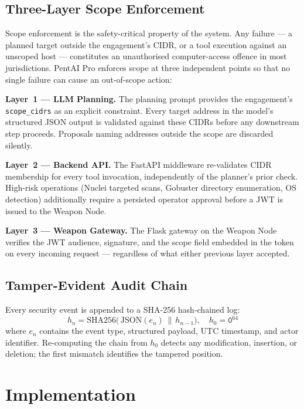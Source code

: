 \documentclass[conference]{IEEEtran}
\begin{document}
\subsection{Three-Layer Scope Enforcement}

Scope enforcement is the safety-critical property of the system.
Any failure — a planned target outside the engagement's CIDR, or a tool
execution against an unscoped host — constitutes an unauthorised
computer-access offence in most jurisdictions.
PentAI Pro enforces scope at three independent points so that no single
failure can cause an out-of-scope action:

\noindent\textbf{Layer~1 — LLM Planning.}
The planning prompt provides the engagement's \texttt{scope\_cidrs} as
an explicit constraint. Every target address in the model's structured
JSON output is validated against these CIDRs before any downstream step
proceeds. Proposals naming addresses outside the scope are discarded
silently.

\noindent\textbf{Layer~2 — Backend API.}
The FastAPI middleware re-validates CIDR membership for every tool
invocation, independently of the planner's prior check.
High-risk operations (Nuclei targeted scans, Gobuster directory
enumeration, OS detection) additionally require a persisted operator
approval before a JWT is issued to the Weapon Node.

\noindent\textbf{Layer~3 — Weapon Gateway.}
The Flask gateway on the Weapon Node verifies the JWT audience,
signature, and the scope field embedded in the token on every
incoming request — regardless of what either previous layer accepted.

\subsection{Tamper-Evident Audit Chain}

Every security event is appended to a SHA-256 hash-chained log:
\begin{equation}
h_n = \mathrm{SHA256}\!\bigl(\,\mathrm{JSON}(e_n)\,\|\,h_{n-1}\bigr),
\quad h_0 = \texttt{0}^{64}
\label{eq:chain}
\end{equation}
where $e_n$ contains the event type, structured payload, UTC timestamp,
and actor identifier.
Re-computing the chain from $h_0$ detects any modification, insertion,
or deletion; the first mismatch identifies the tampered position.

\section{Implementation}
\end{document}
